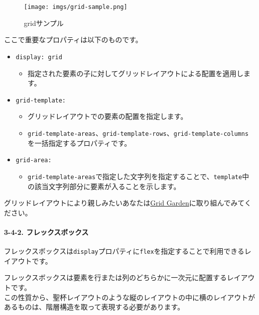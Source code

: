 \begin{figure}
\centering
\texttt{[image: imgs/grid-sample.png]}
\caption{gridサンプル}
\end{figure}

ここで重要なプロパティは以下のものです。

\begin{itemize}
\tightlist
\item
  \texttt{display:\ grid}

  \begin{itemize}
  \tightlist
  \item
    指定された要素の子に対してグリッドレイアウトによる配置を適用します。
  \end{itemize}
\item
  \texttt{grid-template:}

  \begin{itemize}
  \tightlist
  \item
    グリッドレイアウトでの要素の配置を指定します。
  \item
    \texttt{grid-template-areas}、\texttt{grid-template-rows}、\texttt{grid-template-columns}を一括指定するプロパティです。
  \end{itemize}
\item
  \texttt{grid-area:}

  \begin{itemize}
  \tightlist
  \item
    \texttt{grid-template-areas}で指定した文字列を指定することで、\texttt{template}中の該当文字列部分に要素が入ることを示します。
  \end{itemize}
\end{itemize}

グリッドレイアウトにより親しみたいあなたは\href{https://cssgridgarden.com/\#ja}{Grid
Garden}に取り組んでみてください。

\paragraph{3-4-2.
フレックスボックス}\label{ux30d5ux30ecux30c3ux30afux30b9ux30dcux30c3ux30afux30b9}

フレックスボックスは\texttt{display}プロパティに\texttt{flex}を指定することで利用できるレイアウトです。

フレックスボックスは要素を行または列のどちらかに一次元に配置するレイアウトです。\\
この性質から、聖杯レイアウトのような縦のレイアウトの中に横のレイアウトがあるものは、階層構造を取って表現する必要があります。

